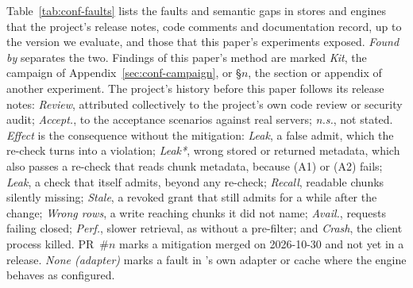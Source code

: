 Table~\ref{tab:conf-faults} lists the faults and semantic gaps in stores and engines that the
project's release notes, code comments and documentation record, up to the version we evaluate,
and those that this paper's experiments exposed. \emph{Found by} separates the two. Findings of this
paper's method are marked \emph{Kit}, the campaign of Appendix~\ref{sec:conf-campaign}, or \S$n$, the
section or appendix of another experiment. The project's history before this paper follows its release notes:
\emph{Review}, attributed collectively to the project's own code review or security audit;
\emph{Accept.}, to the acceptance scenarios against real servers; \emph{n.s.}, not stated. \emph{Effect} is the
consequence without the mitigation: \emph{Leak}, a false admit, which the re-check turns into a
violation; \emph{Leak*}, wrong stored or returned metadata, which also passes a re-check that reads
chunk metadata, because (A1) or (A2) fails; \emph{Leak\textdagger}, a check that itself admits,
beyond any re-check; \emph{Recall}, readable chunks silently missing; \emph{Stale}, a revoked grant
that still admits for a while after the change; \emph{Wrong rows}, a write reaching chunks it did
not name; \emph{Avail.}, requests failing closed; \emph{Perf.}, slower retrieval, as without a
pre-filter; and \emph{Crash}, the client process killed. PR~\#$n$ marks a mitigation merged on
2026-10-30 and not yet in a release. \emph{None (adapter)} marks a fault in \sys{}'s own adapter or
cache where the engine behaves as configured.

